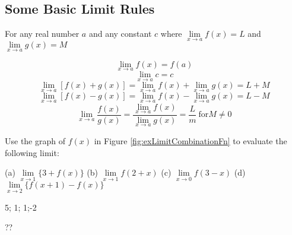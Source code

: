 \newpage
\subsection*{Some Basic Limit Rules}\label{limitRules}
\begin{tcolorbox}[title = {Some Basic Limit Rules}]
For any real number $a$ and any constant $c$ where $\lim\limits_{x \to a}f(x)=L$ and $\lim\limits_{x \to a}g(x)=M$

\begin{equation}\label{eq:limitRule1}
\lim\limits_{x \to a}f(x)=f(a)
\end{equation}
\vspace{-0.5cm}
\begin{equation}\label{eq:limitRule2}
\lim\limits_{x \to a}c=c
\end{equation}
\vspace{-0.5cm}
\begin{equation}\label{eq:limitRule3}
\lim\limits_{x \to a}\left[f(x)+g(x)\right]=\lim\limits_{x \to a}f(x)+\lim\limits_{x \to a}g(x)=L+M
\end{equation}
\vspace{-0.5cm}
\begin{equation}\label{eq:limitRule4}
\lim\limits_{x \to a}\left[f(x)-g(x)\right]=\lim\limits_{x \to a}f(x)-\lim\limits_{x \to a}g(x)=L-M
\end{equation}
\vspace{-0.5cm}
\begin{equation}\label{eq:limitRule5}
\lim\limits_{x \to a}\dfrac{f(x)}{g(x)}=\dfrac{\lim\limits_{x \to a}f(x)}{\lim\limits_{x \to a}g(x)}=\dfrac{L}{m}\ \text{for} M\ne 0
\end{equation}

\end{tcolorbox}
\vspace{-0.5cm}
\begin{example}
Use the graph of $f(x)$ in Figure \ref{fig:exLimitCombinationFn} to evaluate the following limit:
\begin{multicols}{4}
\noindent (a) \(\lim\limits_{x \to 1} \{3+f(x)\}\) 
(b) \(\lim\limits_{x \to 1} \displaystyle{f(2+x)}\) 
(c) \(\lim\limits_{x \to 0}  \displaystyle{f(3-x)}\)
(d) \(\lim\limits_{x \to 2} \{f(x+1)-f(x)\}\)
\end{multicols}

    \begin{sol}
     5; 1; 1;-2
    \end{sol}
    \begin{solL}
    ??
    
    \end{solL}
    
\end{example}

